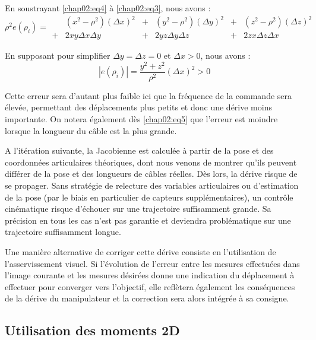 En soustrayant \ref{chap02:eq4} à \ref{chap02:eq3}, nous avons :
\begin{equation}
 \rho^2  e(\rho_i) = \begin{matrix}
             & (x^2 - \rho^2) (\Delta x)^2 &+& (y^2 - \rho^2)  (\Delta y)^2 &+& (z^2 - \rho^2)  (\Delta z)^2\\
             +& 2xy \Delta x \Delta y &+& 2yz \Delta y \Delta z &+& 2zx \Delta z \Delta x
              \end{matrix}
 \label{chap02:eq5}
\end{equation}

En supposant pour simplifier $\Delta y = \Delta z = 0$ et $\Delta x > 0$, nous avons :
\begin{equation}
|e(\rho_i)| = \frac {y^2 + z^2} {\rho^2} (\Delta x)^2 > 0
 \label{chap02:eq6}
\end{equation}

Cette erreur sera d'autant plus faible ici que la fréquence de la commande sera élevée, permettant des déplacements plus petits et donc une dérive moins importante. On notera également dès \ref{chap02:eq5} que l'erreur est moindre lorsque la longueur du câble est la plus grande.

A l'itération suivante, la Jacobienne est calculée à partir de la pose et des coordonnées articulaires théoriques, dont nous venons de montrer qu'ils peuvent différer de la pose et des longueurs de câbles réelles. Dès lors, la dérive risque de se propager. Sans stratégie de relecture des variables articulaires ou d'estimation de la pose (par le biais en particulier de capteurs supplémentaires), un contrôle cinématique risque d'échouer sur une trajectoire suffisamment grande. Sa précision en tous les cas n'est pas garantie et deviendra problématique sur une trajectoire suffisamment longue.

Une manière alternative de corriger cette dérive consiste en l'utilisation de l'asservissement visuel. Si l'évolution de l'erreur entre les mesures effectuées dans l'image courante et les mesures désirées donne une indication du déplacement à effectuer pour converger vers l'objectif, elle reflètera également les conséquences de la dérive du manipulateur et la correction sera alors intégrée à sa consigne.





\subsection{Utilisation des moments 2D}

